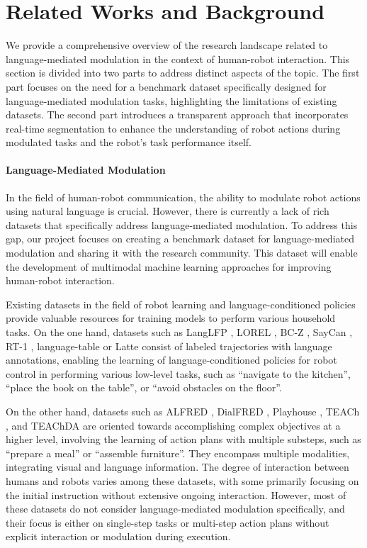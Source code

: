\documentclass[journal]{IEEEtran}
\begin{document}
\section{Related Works and Background}

We provide a comprehensive overview of the research landscape related to
 language-mediated modulation in the context of human-robot interaction. 
 This section is divided into two parts to address distinct aspects of the topic. 
 The first part focuses on the need for a benchmark dataset specifically designed 
 for language-mediated modulation tasks, highlighting the limitations of 
 existing datasets. The second part introduces a transparent approach that 
 incorporates real-time segmentation to enhance the understanding of robot 
 actions during modulated tasks and the robot's task performance itself.

\paragraph*{Language-Mediated Modulation}
In the field of human-robot communication, the ability to modulate robot actions 
using natural language is crucial. However, there is currently a lack of rich 
datasets that specifically address language-mediated modulation. To address this 
gap, our project focuses on creating a benchmark dataset for language-mediated 
modulation and sharing it with the research community. This dataset will enable 
the development of multimodal machine learning approaches for improving human-robot 
interaction.

Existing datasets in the field of robot learning and language-conditioned policies 
provide valuable resources for training models to perform various household tasks. 
On the one hand, datasets such as LangLFP \cite{lynch2021langlfp}, LOREL \cite{nair2022lorel}, 
BC-Z \cite{jang2022bcz}, SayCan \cite{brohan2022saycan}, RT-1 \cite{brohan2022rt1}, 
language-table \cite{lynch2022language} or Latte \cite{bucker2022latte} consist of 
labeled trajectories with language annotations, enabling the learning of 
language-conditioned policies for robot control in performing various low-level 
tasks, such as ``navigate to the kitchen'', ``place the book on the table'', or ``avoid 
obstacles on the floor''.

On the other hand, datasets such as ALFRED \cite{shridhar2020alfred}, 
DialFRED \cite{gao2022dialfred}, Playhouse \cite{team2021play}, TEACh 
\cite{padmakumar2022teach}, and TEAChDA \cite{gella2022teachda} are oriented 
towards accomplishing complex objectives at a higher level, involving the 
learning of action plans with multiple substeps, such as ``prepare a meal'' or
``assemble furniture''. They encompass multiple modalities, integrating visual 
and language information. The degree of interaction between humans and robots
varies among these datasets, with some primarily focusing on the initial 
instruction without extensive ongoing interaction. However, most of these datasets 
do not consider language-mediated modulation specifically, and their focus is
either on single-step tasks or multi-step action plans without explicit 
interaction or modulation during execution.
\end{document}
